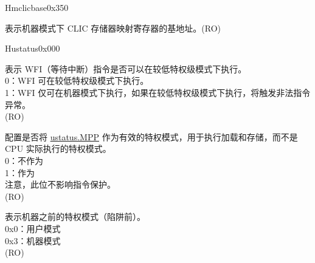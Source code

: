 \begin{register}{H}{mclicbase}{0x350}\label{regdesc:MCLICBASE_REG}
%
\regnewline%
\begin{regdesc}\begin{reglist}
\label{fielddesc:MCLICBASE}\item [MCLICBASE] 表示机器模式下 CLIC 存储器映射寄存器的基地址。(RO)
\end{reglist}\end{regdesc}
\end{register}


\begin{register}{H}{ustatus}{0x000}\label{regdesc:USTATUS}
%
%
%
%
%
%
%
%
%
%
%
%
%
\regnewline%
\begin{regdesc}\begin{reglist}
\label{fielddesc:USTATUSTW}\item [TW] 表示 WFI（等待中断）指令是否可以在较低特权级模式下执行。\\
0：WFI 可在较低特权级模式下执行。\\
1：WFI 仅可在机器模式下执行，如果在较低特权级模式下执行，将触发非法指令异常。\\
(RO)
\label{fielddesc:USTATUS_MPRV}\item [MPRV] 配置是否将 \hyperref[fielddesc:USTATUSMPP]{ustatus.MPP} 作为有效的特权模式，用于执行加载和存储，而不是 CPU 实际执行的特权模式。\\
0：不作为\\
1：作为\\
注意，此位不影响指令保护。\\
(RO)
\label{fielddesc:USTATUSMPP}\item [MPP] 表示机器之前的特权模式（陷阱前）。\\
0x0：用户模式\\
0x3：机器模式\\
(RO)
\item [见下页……]
\end{reglist}\end{regdesc}
\end{register}
\addtocounter{Regfloat}{-1}
